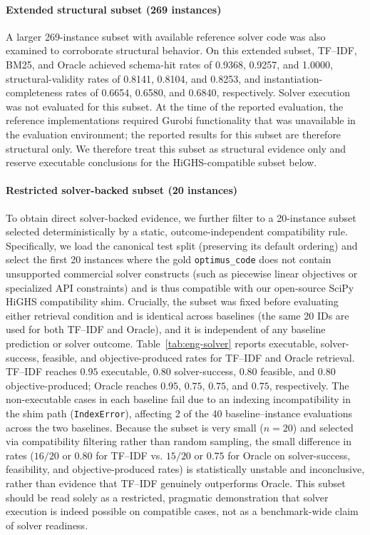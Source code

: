 \documentclass[pdflatex,sn-basic,Numbered]{sn-jnl}
\begin{document}
\paragraph{Extended structural subset (269 instances)} A larger 269-instance subset with available reference solver code was also examined to corroborate structural behavior. On this extended subset, TF--IDF, BM25, and Oracle achieved schema-hit rates of 0.9368, 0.9257, and 1.0000, structural-validity rates of 0.8141, 0.8104, and 0.8253, and instantiation-completeness rates of 0.6654, 0.6580, and 0.6840, respectively. Solver execution was not evaluated for this subset. At the time of the reported evaluation, the reference implementations required Gurobi functionality that was unavailable in the evaluation environment; the reported results for this subset are therefore structural only. We therefore treat this subset as structural evidence only and reserve executable conclusions for the HiGHS-compatible subset below.

\paragraph{Restricted solver-backed subset (20 instances)} To obtain direct solver-backed evidence, we further filter to a 20-instance subset selected deterministically by a static, outcome-independent compatibility rule. Specifically, we load the canonical test split (preserving its default ordering) and select the first 20 instances where the gold \texttt{optimus\_code} does not contain unsupported commercial solver constructs (such as piecewise linear objectives or specialized API constraints) and is thus compatible with our open-source SciPy HiGHS compatibility shim. Crucially, the subset was fixed before evaluating either retrieval condition and is identical across baselines (the same 20 IDs are used for both TF--IDF and Oracle), and it is independent of any baseline prediction or solver outcome. Table~\ref{tab:eng-solver} reports executable, solver-success, feasible, and objective-produced rates for TF--IDF and Oracle retrieval. TF--IDF reaches $0.95$ executable, $0.80$ solver-success, $0.80$ feasible, and $0.80$ objective-produced; Oracle reaches $0.95$, $0.75$, $0.75$, and $0.75$, respectively. The non-executable cases in each baseline fail due to an indexing incompatibility in the shim path (\texttt{IndexError}), affecting 2 of the 40 baseline--instance evaluations across the two baselines. Because the subset is very small ($n=20$) and selected via compatibility filtering rather than random sampling, the small difference in rates ($16/20$ or $0.80$ for TF--IDF vs. $15/20$ or $0.75$ for Oracle on solver-success, feasibility, and objective-produced rates) is statistically unstable and inconclusive, rather than evidence that TF--IDF genuinely outperforms Oracle. This subset should be read solely as a restricted, pragmatic demonstration that solver execution is indeed possible on compatible cases, not as a benchmark-wide claim of solver readiness.
\end{document}
